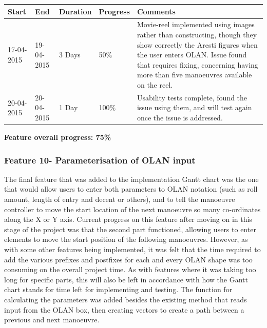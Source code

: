\begin{table}[h]
\begin{tabular}{|l|l|l|l|p{7cm}|}
\hline
\textbf{Start} & \textbf{End} & \textbf{Duration} & \textbf{Progress} & \textbf{Comments}                                                                                                     \\ \hline
17-04-2015     & 19-04-2015   & 3 Days            & 50\%             &  Movie-reel implemented using images rather than constructing, though they show correctly the Aresti figures when the user enters OLAN. Issue found that requires fixing, concerning having more than five manoeuvres available on the reel.\\ \hline
20-04-2015     & 20-04-2015   & 1 Day            & 100\%             &  Usability tests complete, found the issue using them, and will test again once the issue is addressed.\\ \hline
\end{tabular}
\end{table}

\textbf{Feature overall progress: 75\%}

\subsubsection{Feature 10- Parameterisation of OLAN input}
The final feature that was added to the implementation Gantt chart was the one that would allow users to enter both parameters to OLAN notation (such as roll amount, length of entry and decent or others), and to tell the manoeuvre controller to move the start location of the next manoeuvre so many co-ordinates along the X or Y axis. Current progress on this feature after moving on in this stage of the project was that the second part functioned, allowing users to enter elements to move the start position of the following manoeuvres. However, as with some other features being implemented, it was felt that the time required to add the various prefixes and postfixes for each and every OLAN shape was too consuming on the overall project time. As with features where it was taking too long for specific parts, this will also be left in accordance with how the Gantt chart stands for time left for implementing and testing. The function for calculating the parameters was added besides the existing method that reads input from the OLAN box, then creating vectors to create a path between a previous and next manoeuvre.


